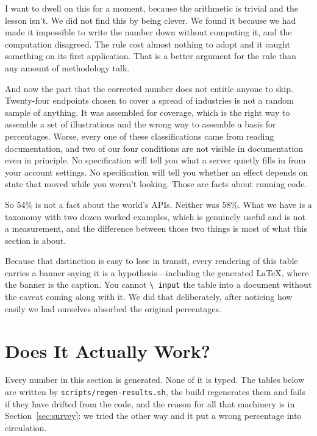 \documentclass[11pt]{article}
\begin{document}
I want to dwell on this for a moment, because the arithmetic is trivial and
the lesson isn't. We did not find this by being clever. We found it because we
had made it impossible to write the number down without computing it, and the
computation disagreed. The rule cost almost nothing to adopt and it caught
something on its first application. That is a better argument for the rule
than any amount of methodology talk.

And now the part that the corrected number does not entitle anyone to skip.
Twenty-four endpoints chosen to cover a spread of industries is not a random
sample of anything. It was assembled for coverage, which is the right way to
assemble a set of illustrations and the wrong way to assemble a basis for
percentages. Worse, every one of these classifications came from reading
documentation, and two of our four conditions are not visible in documentation
even in principle. No specification will tell you what a server quietly fills
in from your account settings. No specification will tell you whether an
effect depends on state that moved while you weren't looking. Those are facts
about running code.

So 54\% is not a fact about the world's APIs. Neither was 58\%. What we have
is a taxonomy with two dozen worked examples, which is genuinely useful and is
not a measurement, and the difference between those two things is most of what
this section is about.

Because that distinction is easy to lose in transit, every rendering of this
table carries a banner saying it is a hypothesis---including the generated
\LaTeX{}, where the banner is the caption. You cannot \texttt{\textbackslash
input} the table into a document without the caveat coming along with it. We
did that deliberately, after noticing how easily we had ourselves absorbed the
original percentages.

\section{Does It Actually Work?}
\label{sec:results}

Every number in this section is generated. None of it is typed. The tables
below are written by \texttt{scripts/regen-results.sh}, the build regenerates
them and fails if they have drifted from the code, and the reason for all that
machinery is in Section~\ref{sec:survey}: we tried the other way and it put a
wrong percentage into circulation.
\end{document}
